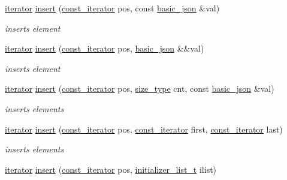 \begin{DoxyCompactItemize}
\hyperlink{classnlohmann_1_1basic__json_a099316232c76c034030a38faa6e34dca}{iterator} \hyperlink{classnlohmann_1_1basic__json_a0136728f5db69d4051c77b94307abd6c}{insert} (\hyperlink{classnlohmann_1_1basic__json_a41a70cf9993951836d129bb1c2b3126a}{const\+\_\+iterator} pos, const \hyperlink{classnlohmann_1_1basic__json}{basic\+\_\+json} \&val)
\begin{DoxyCompactList}\small\item\em inserts element \end{DoxyCompactList}\item 
\hyperlink{classnlohmann_1_1basic__json_a099316232c76c034030a38faa6e34dca}{iterator} \hyperlink{classnlohmann_1_1basic__json_a1ecce113ff11dd294689ee4d45cbb855}{insert} (\hyperlink{classnlohmann_1_1basic__json_a41a70cf9993951836d129bb1c2b3126a}{const\+\_\+iterator} pos, \hyperlink{classnlohmann_1_1basic__json}{basic\+\_\+json} \&\&val)
\begin{DoxyCompactList}\small\item\em inserts element \end{DoxyCompactList}\item 
\hyperlink{classnlohmann_1_1basic__json_a099316232c76c034030a38faa6e34dca}{iterator} \hyperlink{classnlohmann_1_1basic__json_a30a7cc24f2931c20ecae37ec4a5e901f}{insert} (\hyperlink{classnlohmann_1_1basic__json_a41a70cf9993951836d129bb1c2b3126a}{const\+\_\+iterator} pos, \hyperlink{classnlohmann_1_1basic__json_a39f2cd0b58106097e0e67bf185cc519b}{size\+\_\+type} cnt, const \hyperlink{classnlohmann_1_1basic__json}{basic\+\_\+json} \&val)
\begin{DoxyCompactList}\small\item\em inserts elements \end{DoxyCompactList}\item 
\hyperlink{classnlohmann_1_1basic__json_a099316232c76c034030a38faa6e34dca}{iterator} \hyperlink{classnlohmann_1_1basic__json_a404cfe1bdbf1dc6b229627fcf2afb95f}{insert} (\hyperlink{classnlohmann_1_1basic__json_a41a70cf9993951836d129bb1c2b3126a}{const\+\_\+iterator} pos, \hyperlink{classnlohmann_1_1basic__json_a41a70cf9993951836d129bb1c2b3126a}{const\+\_\+iterator} first, \hyperlink{classnlohmann_1_1basic__json_a41a70cf9993951836d129bb1c2b3126a}{const\+\_\+iterator} last)
\begin{DoxyCompactList}\small\item\em inserts elements \end{DoxyCompactList}\item 
\hyperlink{classnlohmann_1_1basic__json_a099316232c76c034030a38faa6e34dca}{iterator} \hyperlink{classnlohmann_1_1basic__json_aa19b9b9ca6967295b102f1cc487b1ad7}{insert} (\hyperlink{classnlohmann_1_1basic__json_a41a70cf9993951836d129bb1c2b3126a}{const\+\_\+iterator} pos, \hyperlink{classnlohmann_1_1basic__json_ad70a098fbc01c53497db29d3b5b656a9}{initializer\+\_\+list\+\_\+t} ilist)

\end{DoxyCompactItemize}
